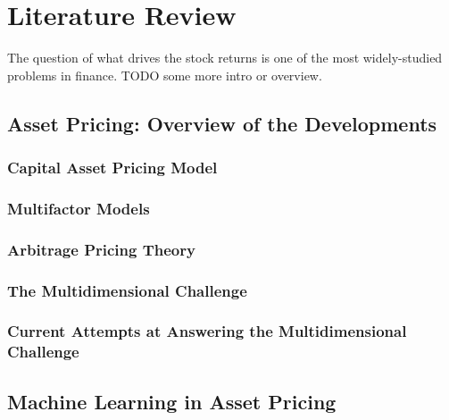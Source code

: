 \chapter{Literature Review}
\label{chap:lit}

	The question of what drives the stock returns is one of the most widely-studied problems in finance. TODO some more intro or overview.
	
	\section{Asset Pricing: Overview of the Developments}
	\label{sec:asset_pricing_lit}
		
		\subsection{Capital Asset Pricing Model}
		
		\subsection{Multifactor Models}
		
		\subsection{Arbitrage Pricing Theory}
		
		\subsection{The Multidimensional Challenge}
		
		\subsection{Current Attempts at Answering the Multidimensional Challenge}
	
	\section{Machine Learning in Asset Pricing} 
	\label{{sec:ml_lit}}
	
	



